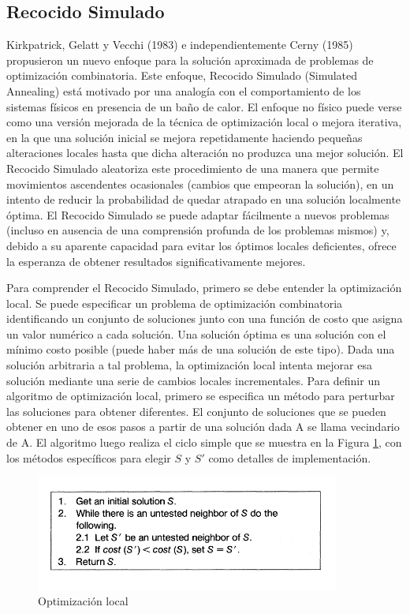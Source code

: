 \documentclass[a4paper,12pt]{book}
\begin{document}
	\subsection{Recocido Simulado}
		Kirkpatrick, Gelatt y Vecchi (1983) e independientemente Cerny (1985) propusieron un nuevo enfoque para la solución aproximada de problemas de optimización combinatoria. Este enfoque, Recocido Simulado \cite{RecocidoSimulado} (Simulated Annealing) está motivado por una analogía con el comportamiento de los sistemas físicos en presencia de un baño de calor. El enfoque no físico puede verse como una versión mejorada de la técnica de optimización local o mejora iterativa, en la que una solución inicial se mejora repetidamente haciendo pequeñas alteraciones locales hasta que dicha alteración no produzca una mejor solución. El Recocido Simulado aleatoriza este procedimiento de una manera que permite movimientos ascendentes ocasionales (cambios que empeoran la solución), en un intento de reducir la probabilidad de quedar atrapado en una solución localmente óptima. El Recocido Simulado se puede adaptar fácilmente a nuevos problemas (incluso en ausencia de una comprensión profunda de los problemas mismos) y, debido a su aparente capacidad para evitar los óptimos locales deficientes, ofrece la esperanza de obtener resultados significativamente mejores.
		
		Para comprender el Recocido Simulado, primero se debe entender la optimización local. Se puede especificar un problema de optimización combinatoria identificando un conjunto de soluciones junto con una función de costo que asigna un valor numérico a cada solución. Una solución óptima es una solución con el mínimo costo posible (puede haber más de una solución de este tipo). Dada una solución arbitraria a tal problema, la optimización local intenta mejorar esa solución mediante una serie de cambios locales incrementales. Para definir un algoritmo de optimización local, primero se especifica un método para perturbar las soluciones para obtener diferentes. El conjunto de soluciones que se pueden obtener en uno de esos pasos a partir de una solución dada A se llama vecindario de A. El algoritmo luego realiza el ciclo simple que se muestra en la Figura \ref{OptLocalRS}, con los métodos específicos para elegir $S$ y $S'$ como detalles de implementación.
		
		\begin{figure}[h]
		\centering
		\includegraphics[width=10cm]{./Graphics/RecocidoSimuladoOptLocal.png}
		\caption{Optimización local}
		\label{OptLocalRS}
		\end{figure}
		
\end{document}
